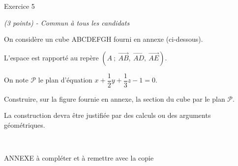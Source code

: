 
%
\begin{h2}Exercice 5\end{h2}
\textit{(3 points) - Commun à tous les candidats}
\par
On considère un cube ABCDEFGH fourni en annexe (ci-dessous).
\par
L'espace est rapporté au repère $\left(A~;~ \overrightarrow{AB},~ \overrightarrow{AD},~ \overrightarrow{AE}\right)$.
\par
On note $\mathscr{P}$ le plan d'équation $x+\dfrac{1}{2} y +\dfrac{1}{3}z -1 = 0$.
\par
Construire, sur la figure fournie en annexe, la section du cube par le plan $\mathscr{P}$.
\par
La construction devra être justifiée par des calculs ou des arguments géométriques.
\par
~
\begin{h2}ANNEXE à compléter et à remettre avec la copie\end{h2}


\begin{center}
\end{center}

